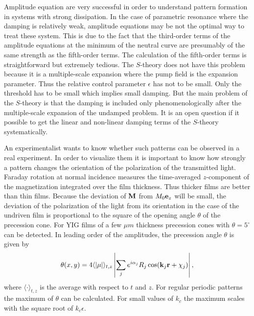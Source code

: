 Amplitude equation are very successful in order to understand pattern
formation in systems with strong dissipation. In the case of
parametric resonance where the damping is relatively weak, amplitude
equations may be not the optimal way to treat these system. This is
due to the fact that the third-order terms of the amplitude equations
at the minimum of the neutral curve are presumably of the same
strength as the fifth-order terms. The calculation of the fifth-order
terms is straightforward but extremely tedious. The $S$-theory does
not have this problem because it is a multiple-scale expansion where
the pump field is the expansion parameter. Thus the relative control
parameter $\epsilon$ has not to be small. Only the threshold has to
be small which implies small damping. But the main problem of the
$S$-theory is that the damping is included only phenomenologically
after the multiple-scale expansion of the undamped problem. It is an
open question if it possible to get the linear and non-linear damping
terms of the $S$-theory systematically.

An experimentalist wants to know whether such patterns can be
observed in a real experiment. In order to visualize them it is
important to know how strongly a pattern changes the orientation of
the polarization of the transmitted light. Faraday rotation at normal
incidence measures the time-averaged $z$-component of the
magnetization integrated over the film thickness.  Thus thicker films
are better than thin films.  Because the deviation of ${\bf M}$ from
$M_0{\bf e}_z$ will be small, the deviation of the polarization of
the light from its orientation in the case of the undriven film is
proportional to the square of the opening angle $\theta$ of the
precession cone. For YIG films of a few $\mu m$ thickness precession
cones with $\theta=5^\circ$ can be detected\cite{gna.87}. In leading
order of the amplitudes, the precession angle $\theta$ is given by 
\begin{equation}
  \theta(x,y)=4\langle|\mu|\rangle_{t,z}\left|\sum_j e^{i\alpha_j}
   R_j\cos({\bf k}_j{\bf r}+\chi_j)\right|,
  \label{theta}
\end{equation}
where $\langle\cdot\rangle_{t,z}$ is the average with respect to $t$
and $z$.  For regular periodic patterns the maximum of $\theta$ can
be calculated. For small values of $k_c$ the maximum scales with the
square root of $k_c\epsilon$. 


